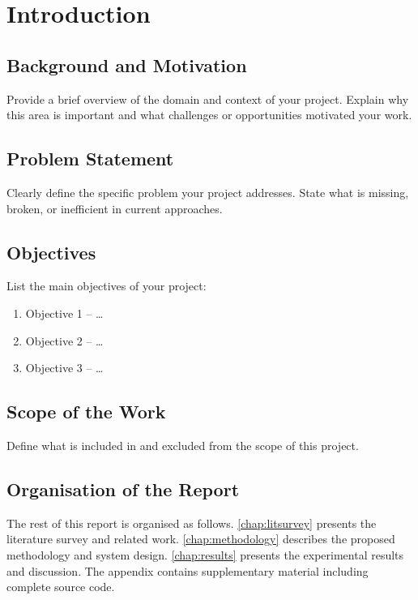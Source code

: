 \chapter{Introduction}
\label{chap:intro}

\section{Background and Motivation}
\label{sec:background}

Provide a brief overview of the domain and context of your project.
Explain why this area is important and what challenges or opportunities
motivated your work.

\section{Problem Statement}
\label{sec:problem}

Clearly define the specific problem your project addresses. State what
is missing, broken, or inefficient in current approaches.

\section{Objectives}
\label{sec:objectives}

List the main objectives of your project:
\begin{enumerate}
  \item Objective 1 -- \ldots
  \item Objective 2 -- \ldots
  \item Objective 3 -- \ldots
\end{enumerate}

\section{Scope of the Work}
\label{sec:scope}

Define what is included in and excluded from the scope of this project.

\section{Organisation of the Report}
\label{sec:organisation}

The rest of this report is organised as follows.
\cref{chap:litsurvey} presents the literature survey and related work.
\cref{chap:methodology} describes the proposed methodology and system
design. \cref{chap:results} presents the experimental results and
discussion. The appendix contains supplementary material including
complete source code.
